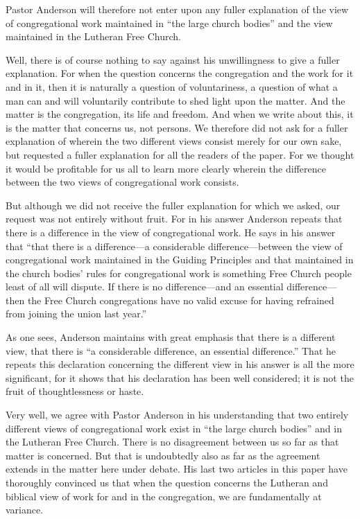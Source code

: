 Pastor Anderson will therefore not enter upon any fuller explanation of the view of congregational work maintained in “the large church bodies” and the view maintained in the Lutheran Free Church.

Well, there is of course nothing to say against his unwillingness to give a fuller explanation. For when the question concerns the congregation and the work for it and in it, then it is naturally a question of voluntariness, a question of what a man can and will voluntarily contribute to shed light upon the matter. And the matter is the congregation, its life and freedom. And when we write about this, it is the matter that concerns us, not persons. We therefore did not ask for a fuller explanation of wherein the two different views consist merely for our own sake, but requested a fuller explanation for all the readers of the paper. For we thought it would be profitable for us all to learn more clearly wherein the difference between the two views of congregational work consists.

But although we did not receive the fuller explanation for which we asked, our request was not entirely without fruit. For in his answer Anderson repeats that there is a difference in the view of congregational work. He says in his answer that “that there is a difference—a considerable difference—between the view of congregational work maintained in the Guiding Principles and that maintained in the church bodies’ rules for congregational work is something Free Church people least of all will dispute. If there is no difference—and an essential difference—then the Free Church congregations have no valid excuse for having refrained from joining the union last year.”

As one sees, Anderson maintains with great emphasis that there is a different view, that there is “a considerable difference, an essential difference.” That he repeats this declaration concerning the different view in his answer is all the more significant, for it shows that his declaration has been well considered; it is not the fruit of thoughtlessness or haste.

Very well, we agree with Pastor Anderson in his understanding that two entirely different views of congregational work exist in “the large church bodies” and in the Lutheran Free Church. There is no disagreement between us so far as that matter is concerned. But that is undoubtedly also as far as the agreement extends in the matter here under debate. His last two articles in this paper have thoroughly convinced us that when the question concerns the Lutheran and biblical view of work for and in the congregation, we are fundamentally at variance.


